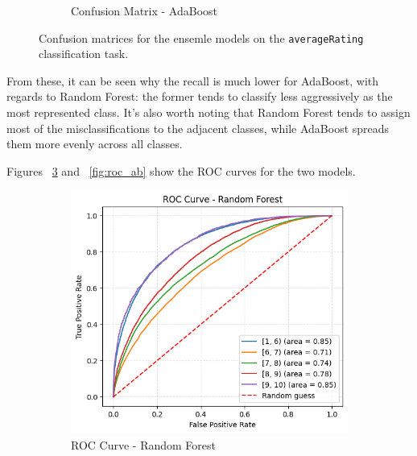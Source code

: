 \begin{figure}[H]
\begin{subfigure}[b]{0.45\textwidth}
        \caption{Confusion Matrix - AdaBoost}
        \label{fig:cm_ab}
    \end{subfigure}
    \caption{Confusion matrices for the ensemle models on the \texttt{averageRating} classification task.}
    \label{fig:cm_comparison}
\end{figure}

From these, it can be seen why the recall is much lower for AdaBoost,
with regards to Random Forest: the former tends to classify less
aggressively as the most represented class.
It's also worth noting that Random Forest tends to assign
most of the misclassifications to the adjacent classes,
while AdaBoost spreads them more evenly across all classes.

Figures ~\ref{fig:roc_rf} and ~\ref{fig:roc_ab} show the ROC curves
for the two models.
\begin{figure}[h]
    \centering
    \begin{subfigure}[b]{0.45\textwidth}
        \centering
        \includegraphics[width=\textwidth]{plotsss/roc_rf_rating}
        \caption{ROC Curve - Random Forest}
        \label{fig:roc_rf}
    \end{subfigure}
    \hfill
    \begin{subfigure}[b]{0.45\textwidth}
        \centering

\end{subfigure}
\end{figure}
